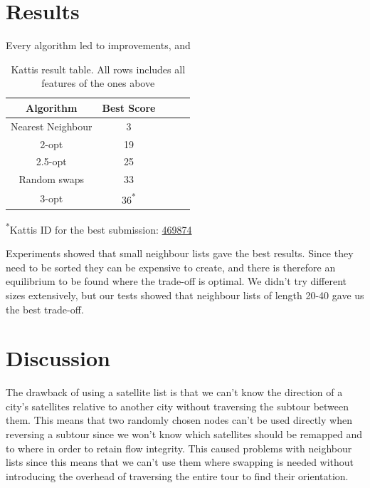 \documentclass[paper=a4, fontsize=11pt,numbers=endperiod]{scrartcl} %
\numberwithin{equation}{section} %
\numberwithin{figure}{section} %
\numberwithin{table}{section} %
\begin{document}
\newpage
\section{Results}

Every algorithm led to improvements, and 

\begin{table}[h]
  \centering
    \begin{tabular}{|c|c|c|c|c|}
    \hline
    \textbf{Algorithm} & \textbf{Best Score} \\ \hline
    Nearest Neighbour & 3 \\ \hline
    2-opt & 19 \\ \hline
    2.5-opt & 25 \\ \hline
    Random swaps & 33 \\ \hline
    3-opt & 36\textsuperscript{*} \\ \hline
    \end{tabular}
    \caption{Kattis result table. All rows includes all features of the ones above}
    \hspace{10pt}
  \end{table}

\textsuperscript{*}Kattis ID for the best submission: \href{https://kth.kattis.scrool.se/submission?id=469874}{469874}

Experiments showed that small neighbour lists gave the best results. Since they need to be sorted they can be expensive to create, and there is therefore an equilibrium to be found where the trade-off is optimal. We didn't try different sizes extensively, but our tests showed that neighbour lists of length 20-40 gave us the best trade-off.




\section{Discussion}


The drawback of using a satellite list is that we can't know the direction of a city's satellites relative to another city without traversing the subtour between them.
This means that two randomly chosen nodes can't be used directly when reversing a subtour since we won't know which satellites should be remapped and to where in order to retain flow integrity.
This caused problems with neighbour lists since this means that we can't use them where swapping is needed without introducing the overhead of traversing the entire tour to find their orientation.
\end{document}
